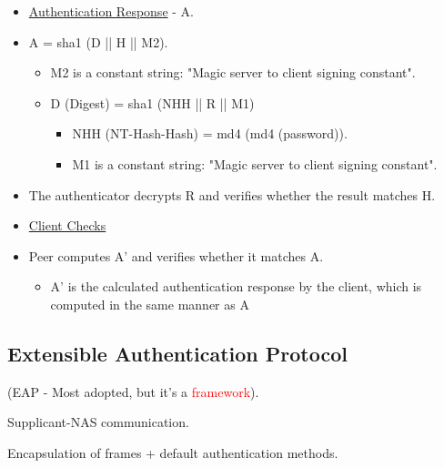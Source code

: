 \begin{tcolorbox}[colback=yellow!10!white, colframe=yellow!70!black, title=Authenticator \textrightarrow Peer] 
    
    \begin{itemize}
        \item \underline{Authentication Response} - A.
        \item A = sha1 (D || H || M2).
        \begin{itemize}
            \item M2 is a constant string: "Magic server to client signing constant".
            \item D (Digest) = sha1 (NHH || R || M1)
            
            \begin{itemize}
                \item NHH (NT-Hash-Hash) = md4 (md4 (password)).
                \item M1 is a constant string: "Magic server to client signing constant".
            \end{itemize}
        \end{itemize}
        \item The authenticator decrypts R and verifies whether the result matches H.
    \end{itemize}
    
\end{tcolorbox}

\begin{tcolorbox}[colback=yellow!10!white, colframe=yellow!70!black, title=Peer] 
    
    \begin{itemize}
        \item \underline{Client Checks}
        \item Peer computes A' and verifies whether it matches A.
        \begin{itemize}
            \item A' is the calculated authentication response by the client, which is computed in the same manner as A
        \end{itemize}
    \end{itemize}
    
\end{tcolorbox}

\clearpage 
\subsection{Extensible Authentication Protocol}
\begin{center}
    (EAP - Most adopted, but it's a \textcolor{red}{framework}).

    Supplicant-NAS communication.

    Encapsulation of frames + default authentication methods.
\end{center}

